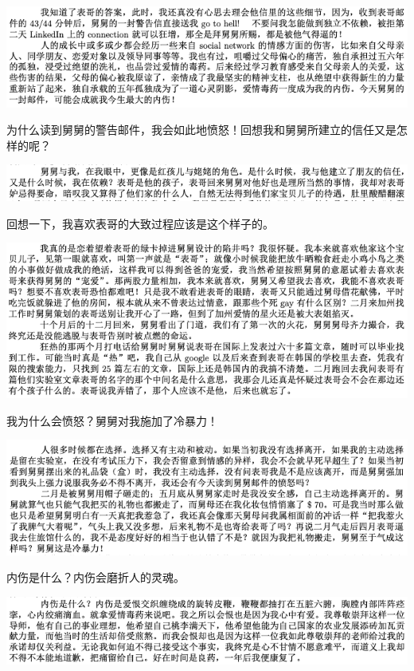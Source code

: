 \documentclass[9pt, b5paper]{article}
\begin{document}
\begin{center}
\includegraphics[width=.9\linewidth]{./pic/p1p64-4.png}
\end{center}

为什么读到舅舅的警告邮件，我会如此地愤怒！回想我和舅舅所建立的信任又是怎样的呢？

\begin{center}
\includegraphics[width=.9\linewidth]{./pic/p1p65.png}
\end{center}

回想一下，我喜欢表哥的大致过程应该是这个样子的。

\begin{center}
\includegraphics[width=.9\linewidth]{./pic/p1p66.png}
\end{center}

我为什么会愤怒？舅舅对我施加了冷暴力！

\begin{center}
\includegraphics[width=.9\linewidth]{./pic/p1p66-2.png}
\end{center}

内伤是什么？内伤会磨折人的灵魂。

\begin{center}
\includegraphics[width=.9\linewidth]{./pic/p1p66-3.png}
\end{center}
\end{document}

